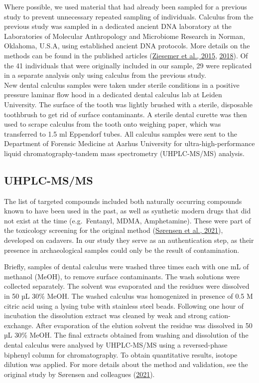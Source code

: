 \documentclass[
  letterpaper,
]{book}
\begin{document}
Where possible, we used material that had already been sampled for a
previous study to prevent unnecessary repeated sampling of individuals.
Calculus from the previous study was sampled in a dedicated ancient DNA
laboratory at the Laboratories of Molecular Anthropology and Microbiome
Research in Norman, Oklahoma, U.S.A, using established ancient DNA
protocols. More details on the methods can be found in the published
articles (\protect\hyperlink{ref-ziesemer16SChallenges2015}{Ziesemer et
al., 2015}, \protect\hyperlink{ref-ziesemerGenomeCalculus2018}{2018}).
Of the 41 individuals that were originally included in our sample, 29
were replicated in a separate analysis only using calculus from the
previous study.\\
New dental calculus samples were taken under sterile conditions in a
positive pressure laminar flow hood in a dedicated dental calculus lab
at Leiden University. The surface of the tooth was lightly brushed with
a sterile, disposable toothbrush to get rid of surface contaminants. A
sterile dental curette was then used to scrape calculus from the tooth
onto weighing paper, which was transferred to 1.5 ml Eppendorf tubes.
All calculus samples were sent to the Department of Forensic Medicine at
Aarhus University for ultra-high-performance liquid
chromatography-tandem mass spectrometry (UHPLC-MS/MS) analysis.

\hypertarget{uhplc-msms}{%
\subsection{UHPLC-MS/MS}\label{uhplc-msms}}

The list of targeted compounds included both naturally occurring
compounds known to have been used in the past, as well as synthetic
modern drugs that did not exist at the time (e.g.~Fentanyl, MDMA,
Amphetamine). These were part of the toxicology screening for the
original method
(\protect\hyperlink{ref-sorensenDrugsCalculus2021}{Sørensen et al.,
2021}), developed on cadavers. In our study they serve as an
authentication step, as their presence in archaeological samples could
only be the result of contamination.

Briefly, samples of dental calculus were washed three times each with
one mL of methanol (MeOH), to remove surface contaminants. The wash
solutions were collected separately. The solvent was evaporated and the
residues were dissolved in 50 µL 30\% MeOH. The washed calculus was
homogenized in presence of 0.5 M citric acid using a lysing tube with
stainless steel beads. Following one hour of incubation the dissolution
extract was cleaned by weak and strong cation-exchange. After
evaporation of the elution solvent the residue was dissolved in 50 µL
30\% MeOH. The final extracts obtained from washing and dissolution of
the dental calculus were analysed by UHPLC-MS/MS using a reversed-phase
biphenyl column for chromatography. To obtain quantitative results,
isotope dilution was applied. For more details about the method and
validation, see the original study by Sørensen and colleagues
(\protect\hyperlink{ref-sorensenDrugsCalculus2021}{2021}).
\end{document}
